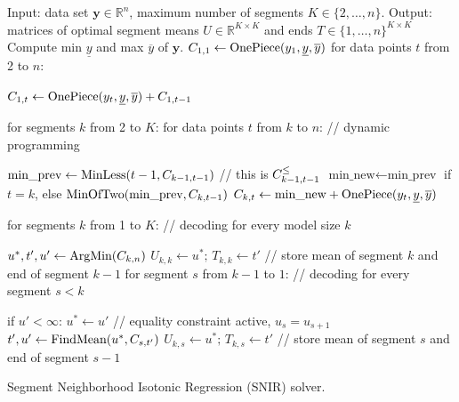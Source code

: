\documentclass{article}
\newcommand{\RR}{\mathbb R}
\begin{document}
\begin{algorithm}[H]
\begin{algorithmic}[1]
\STATE Input: data set $\mathbf y\in\RR^n$, maximum number of segments $K\in\{2,\dots, n\}$.
\STATE Output: matrices of optimal segment means $U\in\RR^{K\times K}$ 
and ends $T\in\{1,\dots,n\}^{K\times K}$
\STATE Compute min $\underline y$ and max $\overline y$ of $\mathbf y$.
\label{line:min-max}
\STATE $C_{1,1}\gets \text{OnePiece}(y_1, \underline y, \overline y)$
\label{line:init-1}
\STATE for data points $t$ from 2 to $n$:
\begin{ALC@g}
  \STATE $C_{1,t}\gets \text{OnePiece}(y_t, \underline y, \overline y) + C_{1,t-1}$
\label{line:init-t}
\end{ALC@g}
\STATE for segments $k$ from 2 to $K$: for data points $t$ from $k$ to $n$: // dynamic programming
\label{line:for-k-t}
\begin{ALC@g}
  \STATE $\text{min\_prev}\gets \text{MinLess}(t-1, C_{k-1,t-1})$ // this is $C_{k-1,t-1}^\leq$
  \label{line:MinLess}
    \STATE $\text{min\_new}\gets\text{min\_prev}$ if $t=k$, 
else $\text{MinOfTwo}(\text{min\_prev}, C_{k, t-1})$
  \label{line:MinOfTwo}
  \STATE $C_{k,t}\gets \text{min\_new} + \text{OnePiece}(y_t, \underline y, \overline y)$
  \label{line:AddNew}
\end{ALC@g}
\STATE for segments $k$ from 1 to $K$: // decoding for every model size $k$
\label{line:for-k-decoding}
\begin{ALC@g}
  \STATE $u^*,t',u'\gets \text{ArgMin}(C_{k,n})$
  \label{line:ArgMin}
  \STATE $U_{k,k}\gets u^*;\, T_{k,k}\gets t'$ // store mean of segment $k$ and end of segment $k-1$
  \label{line:decode-kk}
  \STATE for segment $s$ from $k-1$ to $1$: // decoding for every segment $s<k$
  \label{line:for-s-decoding}
  \begin{ALC@g}
    \STATE if $u' < \infty$: $u^*\gets u'$ // equality constraint active, $u_s = u_{s+1}$
    \label{line:equality-constraint-active}
    \STATE $t',u'\gets\text{FindMean}(u^*, C_{s,t'})$
    \label{line:FindMean}
    \STATE $U_{k,s}\gets u^*;\, T_{k,s}\gets t'$ // store mean of segment $s$ and end of segment $s-1$
    \label{line:decode-ks}
  \end{ALC@g}
\end{ALC@g}
\caption{\label{algo:SNIR}Segment Neighborhood Isotonic Regression (SNIR) solver.}
\end{algorithmic}
\end{algorithm}
\end{document}
